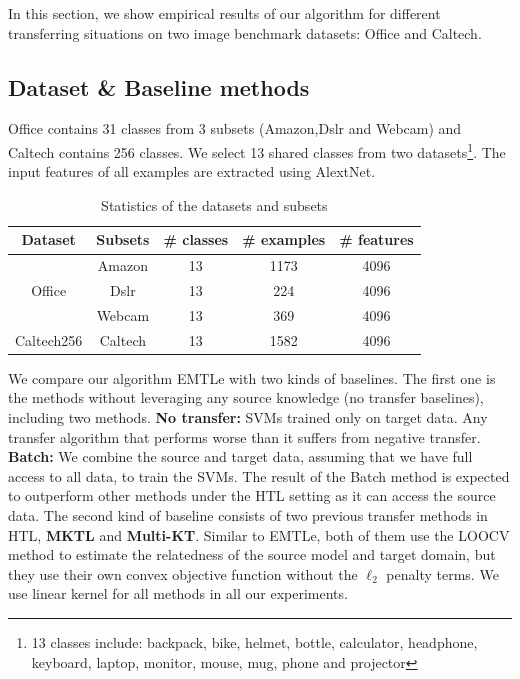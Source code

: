 In this section, we show empirical results of our algorithm for different transferring situations on two image benchmark datasets: Office and Caltech.
\subsection{Dataset \& Baseline methods}
Office contains 31 classes from 3 subsets (Amazon,Dslr and Webcam) and Caltech contains 256 classes. We select 13 shared classes from two datasets\footnote{13 classes include: backpack, bike, helmet, bottle, calculator, headphone, keyboard, laptop, monitor, mouse, mug, phone and projector}. The input features of all examples are extracted using AlextNet\cite{krizhevsky2012imagenet}.
\begin{table}[htbp]
	\centering
	\caption{Statistics of the datasets and subsets}
	\begin{tabular}{|c|c|c|c|c|}
		\hline
		Dataset&Subsets&\# classes &\# examples & \# features\\\hline
		\multirow{3}{*}{Office} & Amazon &13&1173 & 4096\\
		
		& Dslr &13&224 & 4096\\
		& Webcam &13&369 & 4096\\
		\hline
		Caltech256&Caltech&13&1582&4096\\
		\hline
	\end{tabular}%
	\label{tab:class_info}%
\end{table}%
We compare our algorithm EMTLe with two kinds of baselines. The first one is the methods without leveraging any source knowledge (no transfer baselines), including two methods. \textbf{No transfer:} SVMs trained only on target data. Any transfer algorithm that performs worse than it suffers from negative transfer. \textbf{Batch:} We combine the source and target data, assuming that we have full access to all data, to train the SVMs. The result of the Batch method is expected to outperform other methods under the HTL setting as it can access the source data. The second kind of baseline consists of two previous transfer methods in HTL, \textbf{MKTL\cite{jie2011multiclass}} and \textbf{Multi-KT\cite{tommasi2014learning}}. Similar to EMTLe, both of them use the LOOCV method to estimate the relatedness of the source model and target domain, but they use their own convex objective function without the $\ell_2$ penalty terms. We use linear kernel for all methods in all our experiments.
